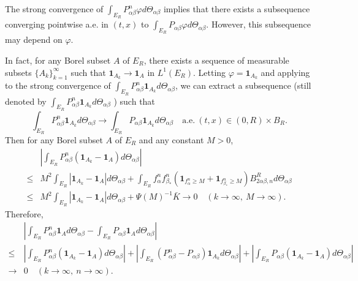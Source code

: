 \documentclass[reqno,11pt]{amsart}
\numberwithin{equation}{section}
\begin{document}
The strong convergence of $	\int_{E_R}   P^n_{\alpha \beta} \varphi d \Theta_{\alpha \beta}$ implies that there exists a subsequence converging pointwise a.e. in $(t,x)$ to $\int_{E_R}  P_{\alpha \beta} \varphi d \Theta_{\alpha \beta}$. However, this subsequence may depend on $\varphi$. 

In fact, for any Borel subset $A$ of $E_R$,  there exists a sequence of measurable subsets $\{ A_k\}_{k=1}^\infty $ such that $\mathbf{1}_{A_k} \to \mathbf{1}_A $ in $L^1( E_R)$. Letting $\varphi = \mathbf{1}_{A_k}$ and applying to the strong convergence of $	\int_{E_R}  P^n_{\alpha \beta} \mathbf{1}_{A_k} d\Theta_{\alpha \beta}$, we can extract a subsequence (still denoted by $	\int_{E_R}   P^n_{\alpha \beta} \mathbf{1}_{A_k} d\Theta_{\alpha \beta}$ ) such that
\begin{equation*}
	\int_{E_R}   P^n_{\alpha \beta} \mathbf{1}_{A_k} d\Theta_{\alpha \beta}  \to  	\int_{E_R}   P_{\alpha \beta}  \mathbf{1}_{A_k} d\Theta_{\alpha \beta}  \quad \text{a.e.} \ (t,x) \in (0,R) \times B_R.
\end{equation*} 
Then for any Borel subset $A$ of $E_R$ and any constant $M>0$,
\begin{align*}
	& \left| \int_{E_R} P^n_{\alpha \beta} ( \mathbf{1}_{A_k}  -  \mathbf{1}_{A }   ) d\Theta_{\alpha \beta} \right| \\
	\leq & M^2 \int_{E_R} |\mathbf{1}_{A_k}  -  \mathbf{1}_{A }| d\Theta_{\alpha \beta} +  \int_{E_R}    f^n_\alpha  f^n_{\beta_* } (\mathbf{1}_{   f ^n_\alpha \geq M}+ \mathbf{1}_{   f_{\beta_*}^n \geq M}) B^R_{ 2\alpha \beta, n} d \Theta_{\alpha \beta} \\
	\leq &  M^2 \int_{E_R} |\mathbf{1}_{A_k}  -  \mathbf{1}_{A }| d\Theta_{\alpha \beta} + \Psi(M)^{-1}\bar{K}  \to 0 \quad ( k \to \infty , \  M \to \infty ).
\end{align*}
Therefore,
\begin{align*}
	&\left| 	\int_{E_R}   P^n_{\alpha \beta} \mathbf{1}_{A } d\Theta_{\alpha \beta} - 	\int_{E_R}   P_{\alpha \beta}  \mathbf{1}_{A } d\Theta_{\alpha \beta} \right| \\
	\leq & \left| \int_{E_R} P^n_{\alpha \beta} ( \mathbf{1}_{A_k}  -  \mathbf{1}_{A }   ) d\Theta_{\alpha \beta} \right| + \left| 	\int_{E_R} ( P^n_{\alpha \beta} -P_{\alpha \beta} ) \mathbf{1}_{A_k}  d\Theta_{\alpha \beta} \right| +  \left| \int_{E_R} P_{\alpha \beta}  ( \mathbf{1}_{A_k}  -  \mathbf{1}_{A }   ) d\Theta_{\alpha \beta} \right| \\
	\to & 0 \quad ( k \to \infty , \  n \to \infty ).
\end{align*} 
\end{document}
